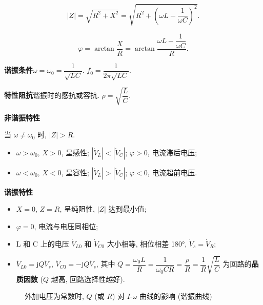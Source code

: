 \documentclass{notes}
\begin{document}
\begin{equation}
    |Z|=\sqrt{R^2+X^2}=\sqrt{R^2+\left(\omega L-\frac{1}{\omega C}\right)^2}.
\end{equation}

\begin{equation}
    \varphi=\arctan\frac{X}{R}=\arctan\frac{\omega L-\dfrac{1}{\omega C}}{R}.
\end{equation}

\textbf{谐振条件}\quad $\omega=\omega_0=\dfrac{1}{\sqrt{LC}}$. $f_0=\dfrac{1}{2\pi\sqrt{LC}}$.

\textbf{特性阻抗}\quad 谐振时的感抗或容抗. $\rho=\sqrt{\dfrac{L}{C}}$.

\textbf{非谐振特性}

当 $\omega\neq\omega_0$ 时, $|Z|>R$.

\begin{itemize}
    \item $\omega>\omega_0$, $X>0$, 呈感性; $|\dot{V}_L|<|\dot{V}_C|$; $\varphi>0$, 电流滞后电压;
    \item $\omega<\omega_0$, $X<0$, 呈容性; $|\dot{V}_L|>|\dot{V}_C|$; $\varphi<0$, 电流超前电压.
\end{itemize}

\textbf{谐振特性}

\begin{itemize}
    \item $X=0$, $Z=R$, 呈纯阻性, $|Z|$ 达到最小值;
    \item $\varphi=0$, 电流与电压同相位;
    \item L 和 C 上的电压 $\dot{V}_{L0}$ 和 $\dot{V}_{C0}$ 大小相等, 相位相差 180°, $\dot{V}_s=\dot{V}_R$;
    \item $\dot{V}_{L0}=\mathrm{j}Q\dot{V}_s$, $\dot{V}_{C0}=-\mathrm{j}Q\dot{V}_s$, 其中 $Q=\dfrac{\omega_0L}{R}=\dfrac{1}{\omega_0CR}=\dfrac{\rho}{R}=\dfrac{1}{R}\sqrt{\dfrac{L}{C}}$ 为回路的\textbf{品质因数} ($Q$ 越高, 回路选择性越好).
\end{itemize}

\begin{figure}[ht]
    \centering
    \caption{外加电压为常数时, $Q$ (或 $R$) 对 $I$-$\omega$ 曲线的影响 (谐振曲线)}
\end{figure}
\end{document}
